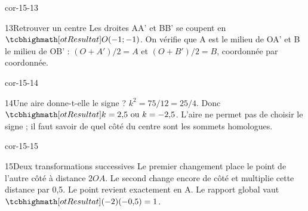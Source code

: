 \begin{blocLivre}{cor-15-13}\begin{corrige}{13}{Retrouver un centre}
Les droites AA’ et BB’ se coupent en $\res{O(-1;-1)}$. On vérifie que A est le milieu de OA’ et B le milieu de OB’ : $(O+A')/2=A$ et $(O+B')/2=B$, coordonnée par coordonnée.
\label{fig-cor-15-13}
\end{corrige}\end{blocLivre}
\begin{blocLivre}{cor-15-14}\begin{corrige}{14}{Une aire donne-t-elle le signe ?}
$k^2=75/12=25/4$. Donc $\res{k=2{,}5\text{ ou }k=-2{,}5}$. L’aire ne permet pas de choisir le signe ; il faut savoir de quel côté du centre sont les sommets homologues.
\label{fig-cor-15-14}
\end{corrige}\end{blocLivre}
\begin{blocLivre}{cor-15-15}\begin{corrige}{15}{Deux transformations successives}
Le premier changement place le point de l’autre côté à distance $2OA$. Le second change encore de côté et multiplie cette distance par 0,5. Le point revient exactement en A. Le rapport global vaut $\res{(-2)(-0{,}5)=1}$.
\label{fig-cor-15-15}
\end{corrige}\end{blocLivre}
